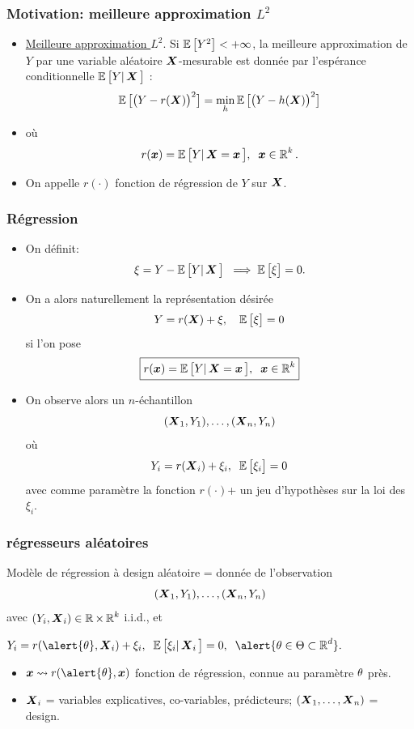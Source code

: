 \begin{frame}
\frametitle{Motivation: meilleure approximation $L^2$}
\begin{itemize}
\item \underline{Meilleure approximation $L^2$}. Si
$\E\big[Y^2\big]<+\infty$, la meilleure approximation de $Y$ par une
variable aléatoire $\bX$-mesurable est donnée par
\alert{l'espérance conditionnelle} $\E\big[Y|\bX\big]$ :
$$\E\big[\big(Y-r(\bX)\big)^2\big] = \min_h \E\big[\big(Y-h(\bX)\big)^2\big]$$
\item o\`u
$$r(\bx) = \E\big[Y|\bX=\bx\big],\;\;\bx \in \R^k.$$
\item On appelle $r(\cdot)$ \alert{fonction de régression de $Y$ sur
$\bX$}.
\end{itemize}
\end{frame}

\begin{frame}
\frametitle{Régression}
\begin{itemize}
\item On définit:
$$\xi = Y-\E\big[Y|\bX \big]\;\;\Longrightarrow\; \E\big[\xi\big]=0.$$
\item On a alors naturellement la représentation désirée
$$Y=r(\bX)+\xi, \quad \E\big[\xi\big]=0$$
si l'on pose
$$\boxed{r(\bx) = \E\big[Y|\bX=\bx\big],\;\;\bx \in \R^k}$$

\item On observe alors un $n$-échantillon
$$(\bX_1,Y_1),\ldots, (\bX_n,Y_n)$$
où
$$Y_i = r(\bX_i)+\xi_i,\;\;\E\big[\xi_i\big]=0$$
avec comme \alert{paramètre la fonction $r(\cdot)$}+ un \alert{jeu d'hypothèses} sur la loi des $\xi_i$.
\end{itemize}
\end{frame}

\begin{frame}
\frametitle{régresseurs aléatoires}
\begin{df}
Modèle de régression \alert{à design aléatoire} = donnée de
l'observation
$$(\bX_1,Y_1),\ldots, (\bX_n,Y_n)$$
avec $(Y_i,\bX_i)\in \R\times \R^k$ \alert{i.i.d.},
et\\\vspace{3mm} \centerline{$Y_i =
r(\alert{\truetheta},\bX_i)+\xi_i,\;\;
\E\big[\xi_i|\bX_i\big]=0,\;\;\alert{
\truetheta \in \Theta \subset \R^d}.$}
\begin{itemize}
\item $\bx \leadsto r(\alert{\truetheta},\bx)$ fonction de \alert{ régression}, connue au paramètre
$\truetheta$ près.
\item $\bX_i$ = variables explicatives, co-variables, prédicteurs;
$(\bX_1,\ldots,\bX_n)$ = \alert{design}.
\end{itemize}
\end{df}
\end{frame}

